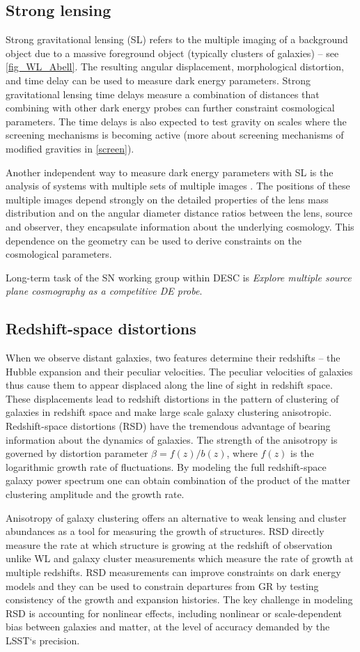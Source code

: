 \subsection{Strong lensing}
Strong gravitational lensing (SL) refers to the multiple imaging of a background object due to a massive foreground object (typically clusters of galaxies) -- see \autoref{fig_WL_Abell}. The resulting angular displacement, morphological distortion, and time delay can be used to measure dark energy parameters. Strong gravitational lensing time delays measure a combination of distances that combining with other dark energy probes can further constraint cosmological parameters. The time delays is also expected to test gravity on scales where the screening mechanisms is becoming active (more about screening mechanisms of modified gravities in \autoref{screen}).

Another independent way to measure dark energy parameters with SL is the analysis of systems with multiple sets of multiple images \cite{SL_in_CLGs}. The positions of these multiple images depend strongly on the detailed properties of the lens mass distribution and on the angular diameter distance ratios between the lens, source and observer, they encapsulate information about the underlying cosmology. This dependence on the geometry can be used to derive constraints on the cosmological parameters.

Long-term task of the SN working group within DESC is \textit{Explore multiple source plane cosmography as a competitive DE probe}.
\subsection{Redshift-space distortions}
When we observe distant galaxies, two features determine their redshifts -- the Hubble expansion and their peculiar velocities. The peculiar velocities of galaxies thus cause them to appear displaced along the line of sight in redshift space. These displacements lead to redshift distortions in the pattern of clustering of galaxies in redshift space and make large scale galaxy clustering anisotropic. Redshift-space distortions (RSD) have the tremendous advantage of bearing information about the dynamics of galaxies. The strength of the anisotropy is governed by distortion parameter $\beta = f(z)/b(z)$, where $f(z)$ is the logarithmic growth rate of fluctuations. By modeling the full redshift-space galaxy power spectrum one can obtain combination of the product of the matter clustering amplitude and the growth rate.

Anisotropy of galaxy clustering offers an alternative to weak lensing and cluster abundances as a tool for measuring the growth of structures. RSD directly measure the rate at which structure is growing at the redshift of observation unlike WL and galaxy cluster measurements  which measure the rate of growth at multiple redshifts. RSD measurements can improve constraints on dark energy models and they can be used to constrain departures from GR by testing consistency of the growth and expansion histories. The key challenge in modeling RSD is accounting for nonlinear effects, including nonlinear or scale-dependent bias between galaxies and matter, at the level of accuracy demanded by the LSST`s precision.